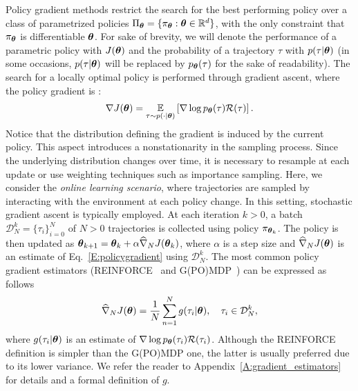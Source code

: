 Policy gradient methods restrict the search for the best performing policy over a class of parametrized policies $\Pi_{\vtheta}=\{\pol: \vtheta \in \realspace^d\}$, with the only constraint that $\pol$ is differentiable \wrt $\vtheta$. For sake of brevity, we will denote the performance of a parametric policy with $J(\vtheta)$ and the probability of a trajectory $\tau$ with $p(\tau|\vtheta)$ (in some occasions, $p(\tau|\vtheta)$ will be replaced by $p_{\vtheta}(\tau)$ for the sake of readability).
The search for a locally optimal policy is performed through gradient ascent, where the policy gradient
is \cite{sutton2000policy, Peters2008reinf}:
\begin{align} \label{E:policygradient}
	\gradJ{\vtheta} = \EVV[\tau \sim p(\cdot|\vtheta)]{\score{\vtheta}{\tau}\Reward(\tau)}.
\end{align}
Notice that the distribution defining the gradient is induced by the current policy. This aspect introduces a nonstationarity in the sampling process. Since the underlying distribution changes over time, it is necessary to resample at each update or use weighting techniques such as importance sampling.
Here, we consider the \emph{online learning scenario}, where trajectories are sampled by interacting with the environment at each policy change. 
In this setting, stochastic gradient ascent is typically employed.
At each iteration $k >0$, a batch $\mathcal{D}_N^k = \{\tau_i\}_{i=0}^N$ of $N>0$ trajectories is collected using policy $\pi_{\vtheta_k}$.
The policy is then updated as $\vtheta_{k+1}  = \vtheta_k + \alpha\gradApp{\vtheta_k}{N}$, where $\alpha$ is a step size and $\gradApp{\vtheta}{N}$ is an estimate of Eq.~\eqref{E:policygradient} using $\mathcal{D}_N^k$. The most common policy gradient estimators (\eg REINFORCE~\citep{williams1992simple} and G(PO)MDP~\citep{baxter2001infinite}) can be expressed as follows
\begin{align} \label{E:policygradient.estimate}
	\gradApp{\vtheta}{N} = \frac{1}{N}\sum_{n=1}^{N} g(\tau_i|\vtheta), \quad \tau_i \in \mathcal{D}_N^k,
\end{align}
where $g(\tau_i|\vtheta)$ is an estimate of $\score{\vtheta}{\tau_i}\Reward(\tau_i)$.
Although the REINFORCE definition is simpler than the G(PO)MDP one, the latter is usually preferred due to its lower variance.
We refer the reader to Appendix~\ref{A:gradient_estimators} for details and a formal definition of $g$.

